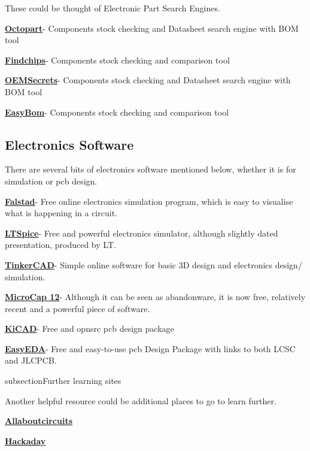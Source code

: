 \documentclass[a4paper,11pt]{report}
\let\oldhref\href %
\renewcommand{\href}[2]{\oldhref{#1}{\bfseries#2}}
\begin{document}
These could be thought of Electronic Part Search Engines.

\href{https://octopart.com/}{Octopart}- Components stock checking and Datasheet search engine with BOM tool

\href{https://www.findchips.com/}{Findchips}- Components stock checking and comparison tool

\href{https://www.oemsecrets.com/}{OEMSecrets}- Components stock checking and Datasheet search engine with BOM tool

\href{https://www.easybom.com/}{EasyBom}- Components stock checking and comparison tool

\vspace*{1\baselineskip}

\subsection{Electronics Software}

There are several bits of electronics software mentioned below, whether it is for simulation or \gls{pcb} design.

\href{https://www.falstad.com/circuit/}{Falstad}- Free online electronics simulation program, which is easy to visualise what is happening in a circuit.

\href{https://www.analog.com/en/design-center/design-tools-and-calculators/lt\gls{spi}ce-simulator.html}{LTSpice}- Free and powerful electronics simulator, although slightly dated presentation, produced by LT.

\href{https://www.tinkercad.com/}{TinkerCAD}- Simple online software for basic 3D design and electronics design/ simulation.

\href{http://www.spectrum-soft.com/download/download.shtm}{MicroCap 12}- Although it can be seen as abandonware, it is now free, relatively recent and a powerful piece of software.

\href{https://www.kicad.org/}{KiCAD}- Free and \gls{opnsrc} \gls{pcb} design package

\href{https://easyeda.com/}{EasyEDA}- Free and easy-to-use \gls{pcb} Design Package with links to both LCSC and JLCPCB.

subsection{Further learning sites}

Another helpful resource could be additional places to go to learn further.

\href{https://www.allaboutcircuits.com/}{Allaboutcircuits}

\href{https://hackaday.com/}{Hackaday}
\end{document}
